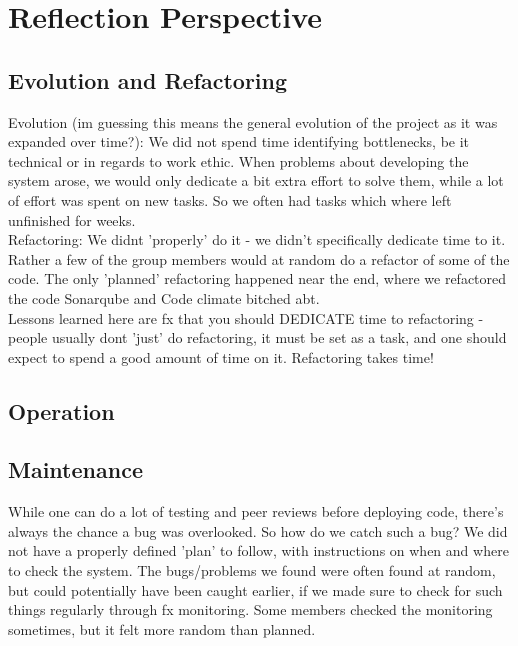 \section{Reflection Perspective}
\subsection{Evolution and Refactoring}
Evolution (im guessing this means the general evolution of the project as it was expanded over time?): We did not spend time identifying bottlenecks, be it technical or in regards to work ethic. When problems about developing the system arose, we would only dedicate a bit extra effort to solve them, while a lot of effort was spent on new tasks. So we often had tasks which where left unfinished for weeks.\\


Refactoring: We didnt 'properly' do it - we didn't specifically dedicate time to it. Rather a few of the group members would at random do a refactor of some of the code. The only 'planned' refactoring happened near the end, where we refactored the code Sonarqube and Code climate bitched abt.\\
Lessons learned here are fx that you should DEDICATE time to refactoring - people usually dont 'just' do refactoring, it must be set as a task, and one should expect to spend a good amount of time on it. Refactoring takes time!\\

\subsection{Operation}

\subsection{Maintenance}
While one can do a lot of testing and peer reviews before deploying code, there's always the chance a bug was overlooked. So how do we catch such a bug? We did not have a properly defined 'plan' to follow, with instructions on when and where to check the system. The bugs/problems we found were often found at random, but could potentially have been caught earlier, if we made sure to check for such things regularly through fx monitoring. Some members checked the monitoring sometimes, but it felt more random than planned.  